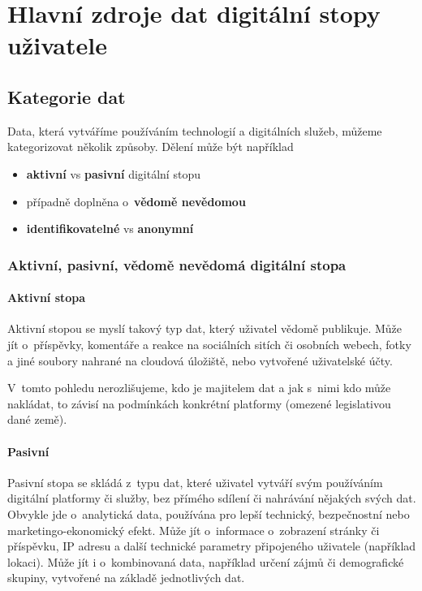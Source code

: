 \chapter{Hlavní zdroje dat digitální stopy uživatele}

\section{Kategorie dat}
Data, která vytváříme používáním technologií a digitálních služeb, můžeme kategorizovat několik způsoby. Dělení může být například
\begin{itemize}
	\item \textbf{aktivní} vs \textbf{pasivní} digitální stopu \citep{pew-digital-footprint}
    \item případně doplněna o~\textbf{vědomě nevědomou} \citep{fish-digital-footprint}
\item \textbf{identifikovatelné} vs \textbf{anonymní}
\end{itemize}


\subsection{Aktivní, pasivní, vědomě nevědomá digitální stopa}
\subsubsection{Aktivní stopa}
Aktivní stopou se myslí takový typ dat, který uživatel vědomě publikuje. Může jít o~příspěvky, komentáře a reakce na sociálních sitích či osobních webech, fotky a jiné soubory nahrané na cloudová úložiště, nebo vytvořené uživatelské účty.\citep{pew-digital-footprint}

V~tomto pohledu nerozlišujeme, kdo je majitelem dat a jak s~nimi kdo může nakládat, to závisí na podmínkách konkrétní platformy (omezené legislativou dané země).

\subsubsection{Pasivní}

Pasivní stopa se skládá z~typu dat, které uživatel vytváří svým používáním digitální platformy či služby, bez přímého sdílení či nahrávání nějakých svých dat. Obvykle jde o~analytická data, používána pro lepší technický, bezpečnostní nebo marketingo-ekonomický efekt. Může jít o~informace o~zobrazení stránky či příspěvku, IP adresu a další technické parametry připojeného uživatele (například lokaci). Může jít i o~kombinovaná data, například určení zájmů či demografické skupiny, vytvořené na základě jednotlivých dat.

